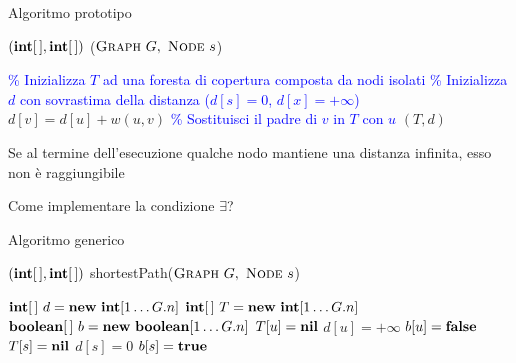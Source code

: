 \begin{frame}{Algoritmo prototipo}

\vspace{-9pt}
\begin{Procedure}
\caption[A]{$(\INTARRAY, \INTARRAY)$ \shortestprototype($\textsc{Graph}\ G,\ \textsc{Node}\ s$)}

\textcolor{blue}{\% Inizializza $T$ ad una foresta di copertura composta da nodi isolati}\;
\textcolor{blue}{\% Inizializza $d$ con sovrastima della distanza ($d[s]=0$, $d[x] = +\infty$)}\;
{
  $d[v] = d[u] + w(u,v)$\;
  \textcolor{blue}{\% Sostituisci il padre di $v$ in $T$ con $u$}\;
}
\Return $(T,d)$
\end{Procedure}

\vspace{-6pt}
\begin{myboxtitle}[Note]
\BI
\item Se al termine dell'esecuzione qualche nodo mantiene una distanza infinita, esso non è raggiungibile
\item Come implementare la condizione $\exists$?
\EI
\end{myboxtitle}
\end{frame}

\begin{frame}{Algoritmo generico}

\vspace{-9pt}
\begin{Procedure}
\caption[A]{$(\INTARRAY, \INTARRAY)$ \textsf{shortestPath}($\textsc{Graph}\ G,\ \textsc{Node}\ s$)}

$\INTEGER[\,]\ d = \NEW\ \INTEGER[1 \mldots G.n]$
$\INTEGER[\,]\ T = \NEW\ \INTEGER[1 \mldots G.n]$
$\BOOLEAN[\,]\ b = \NEW\ \BOOLEAN[1 \mldots G.n]$
{
  $T[u] = \textbf{nil}$\;
  $d[u] = +\infty$\; 
  $b[u] = \FALSE$\;
}
$T[s] = \textbf{nil}$\; 
$d[s] = 0$\; 
$b[s] = \TRUE$\;
[...]
\end{Procedure}

\end{frame}


